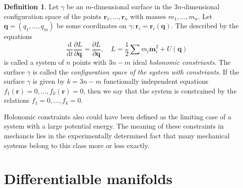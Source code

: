 \documentclass[conference]{IEEEtran}
\theoremstyle{definition}
\newtheorem{definition}{Definition}[section]
\theoremstyle{remark}
\begin{document}
    \begin{definition}
        Let $\gamma$ be an $m$-dimensional surface in the $3n$-dimensional configuration space of the points $\mathbf{r}_1, \dots, \mathbf{r}_n$ with masses $m_1, \dots, m_n$. Let $\mathbf{q} = (q_1, \dots, q_m)$ be some coordinates on $\gamma: \mathbf{r}_i = \mathbf{r}_i(\mathbf{q})$. The described by the equations
        \begin{equation*}
            \dfrac{\mathrm{d}}{\mathrm{d} t} \dfrac{\partial L}{\partial \dot{\mathbf{q}}} = \dfrac{\partial L}{\partial \mathbf{q}}, \quad L = \dfrac12\sum m_i \dot{\mathbf{m}}_i^2 + U(\mathbf{q})
        \end{equation*}
        is called a system of $n$ points with $3n - m$ ideal \emph{holonomic constriants}. The surface $\gamma$ is called the \emph{configuration space of the system with constriants}. If the surface $\gamma$ is given by $k = 3n - m$ functionally independent equations $f_1(\mathbf{r}) = 0, \dots, f_k(\mathbf{r}) = 0$, then we say that the system is constrained by the relations $f_1 = 0, \dots, f_k = 0$.
    \end{definition}

    Holonomic constraints also could have been defined as the limiting case of a system with a large potential energy. The meaning of these constraints in mechancis lies in the experimentally determined fact that many mechanical systems belong to this class more or less exactly.

    \section{Differentialble manifolds}
\end{document}
